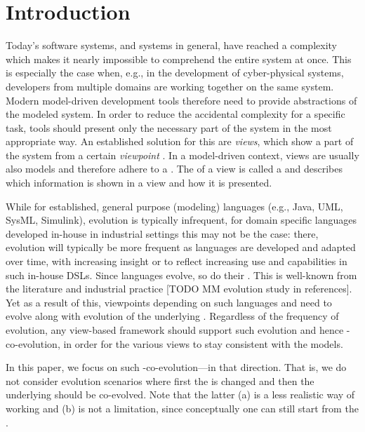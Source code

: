 \section{Introduction}
\label{sec:Introduction}

Today's software systems, and systems in general, have reached a complexity which makes it nearly impossible to comprehend the entire system at once.
This is especially the case when, e.g., in the development of cyber-physical systems, developers from multiple domains are working together on the same system.
Modern model-driven development tools therefore need to provide abstractions of the modeled system.
In order to reduce the accidental complexity for a specific task, tools should present only the necessary part of the system in the most appropriate way.
An established solution for this are \emph{views}, which show a part of the system from a certain \emph{viewpoint} \autocite{atkinson_orthographic_2010}.
In a model-driven context, views are usually also models and therefore adhere to a \metamodel.
The \metamodel of a view is called a \viewtype \autocite{goldschmidt_towards_2012} and describes which information is shown in a view and how it is presented.

While for established, general purpose (modeling) languages (e.g., Java, UML, SysML, Simulink), evolution is typically infrequent, for domain specific languages developed in-house in industrial settings this may not be the case: there, evolution will typically be more frequent as languages are developed and adapted over time, with increasing insight or to reflect increasing use and capabilities in such in-house DSLs. Since languages evolve, so do their \metamodels. This is well-known from the literature and industrial practice [TODO MM evolution study in references]. Yet as a result of this, viewpoints depending on such languages and \metamodels need to evolve along with evolution of the underlying \metamodels. Regardless of the frequency of \metamodel evolution, any view-based framework should support such evolution and hence \metamodel-\viewtype co-evolution, in order for the various views to stay consistent with the models. 

In this paper, we focus on such \metamodel-\viewtype co-evolution---in that direction. That is, we do not consider evolution scenarios where first the \viewtype is changed and then the underlying \metamodel should be co-evolved. Note that the latter (a) is a less realistic way of working and (b) is not a limitation, since conceptually one can still start from the \viewtype.

